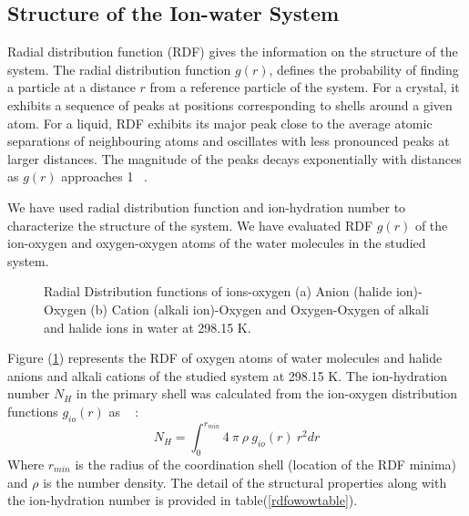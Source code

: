 \subsection {Structure of the Ion-water System}

Radial distribution function (RDF)  gives the information on the structure of the system. The  radial distribution function $g(r)$, defines the probability of finding a particle at a distance $r$ from a reference  particle of the system.  For a crystal, it exhibits a sequence of peaks at positions corresponding to shells around a given atom. For a  liquid, RDF exhibits its major peak close to the average atomic separations of neighbouring atoms and oscillates with less pronounced peaks at larger distances. The magnitude of the peaks decays exponentially with distances as $g(r)$ approaches 1 ~\citep{mcquarrie2000, Ercolessi1997}.

We have used radial distribution function and ion-hydration number to characterize the structure of the system. We have evaluated  RDF $g(r)$ of the ion-oxygen and oxygen-oxygen atoms of the water molecules in the studied system.

 \begin{figure}[h!]
 \centering
   \caption[Ion-Oxygen and Oxygen-Oxygen radial distribution function $\mathrm{g_{Ion-OW}}(r)$ of the alkali and halide ions in water.] {Radial Distribution functions of ions-oxygen  (a)  Anion (halide ion)-Oxygen  (b)  Cation (alkali ion)-Oxygen and Oxygen-Oxygen of alkali and halide ions in water at 298.15 K.}
 \label{rdfanion}
 \end{figure}

 Figure (\ref{rdfanion}) represents the RDF of oxygen atoms of water molecules and halide anions  and alkali cations of the studied system at 298.15 K. The ion-hydration number $N_H$ in the primary shell was calculated from the ion-oxygen distribution functions $g_{io}(r)$ as ~ \citep{mcquarrie2000}:
\begin{equation}
N_H = \int_0^{r_{min}} 4~ \pi ~\rho~ g_{io}(r)~r^2 dr
\end{equation}
Where $r_{min}$ is the radius of the coordination shell (location of the RDF minima) and $\rho$ is the number density. The detail of the structural properties along with the ion-hydration number  is provided in table(\ref{rdfowowtable}).

